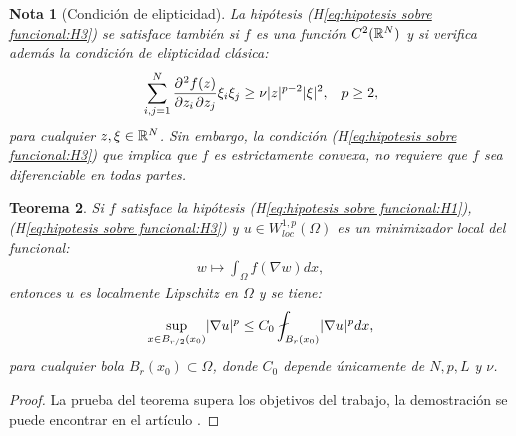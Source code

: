 \documentclass[a4paper,11pt,spanish, twoside, leqno]{tfm-uam}
\newtheorem{teo}{Teorema}[chapter]
\newtheorem{nota}[teo]{Nota}
\begin{document}
\begin{nota}[Condición de elipticidad]
La hipótesis (H\ref{eq:hipotesis sobre funcional:H3}) se satisface también si $f$ es una función $C^{2}(\mathbb{R}^{N})$ y si verifica además la condición de elipticidad clásica:
\begin{align}
\begin{array}{ll}
\displaystyle
\sum_{i,j=1}^{N}\diffp{f(z)}{z_{i},z_{j}}\xi_{i}\xi_{j}\geq \nu \abs{z}^{p-2}\abs{\xi}^{2}, & p\geq 2,
\end{array}
\end{align}
para cualquier $z,\xi\in \mathbb{R}^{N}$.
Sin embargo, la condición (H\ref{eq:hipotesis sobre funcional:H3}) que implica que $f$ es estrictamente convexa, no requiere que $f$ sea diferenciable en todas partes.
\end{nota}

\begin{teo}\label{teo:regularity propierties functional f}
Si $f$ satisface la hipótesis (H\ref{eq:hipotesis sobre funcional:H1}), (H\ref{eq:hipotesis sobre funcional:H3}) y $u\in W_{loc}^{1,p}(\Omega)$ es un minimizador local del funcional:
\begin{align*}
w\mapsto \int_{\Omega}f(\nabla{w})dx,
\end{align*}
entonces $u$ es localmente Lipschitz en $\Omega$ y se tiene:
\begin{align}\label{teo:regularity propierties functional f:eq:1}
\sup_{x\in B_{r/2}(x_{0})}\abs{\nabla{u}}^{p}\leq C_{0}\fint_{B_{r}(x_0)}\abs{\nabla{u}}^{p}dx,
\end{align}
para cualquier bola $B_{r}(x_{0})\subset \Omega$, donde $C_{0}$ depende únicamente de $N,p,L$ y $\nu$.
\end{teo}
\begin{proof}
La prueba del teorema supera los objetivos del trabajo, la demostración se puede encontrar en el artículo \cite{fonseca1997regularity}.
\end{proof}
\end{document}
